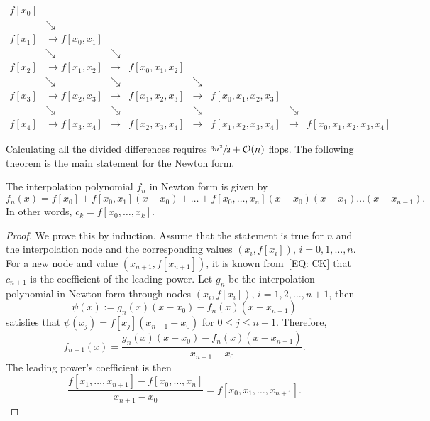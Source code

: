 \begin{tcolorbox}
    \begin{equation}\label{EQ: ALG NEWTON}
    \begin{aligned}
        f[x_0] &               &\\ 
               &\searrow       &\\ 
        f[x_1] &\to f[x_0, x_1]& \\
               &\searrow        &\searrow&\\ 
        f[x_2] & \to f[x_1, x_2]&\to& f[x_0, x_1, x_2]\\
               &\searrow        &\searrow& &\searrow&\\ 
        f[x_3] &\to f[x_2, x_3] &\to& f[x_1, x_2, x_3] &\to & f[x_0, x_1, x_2, x_3]\\
               &\searrow        &\searrow & &\searrow&  &\searrow &\\ 
        f[x_4] & \to f[x_3, x_4]&\to& f[x_2, x_3, x_4] &\to & f[x_1, x_2, x_3, x_4] &\to&  f[x_0, x_1, x_2, x_3, x_4] 
    \end{aligned}
\end{equation}
\end{tcolorbox}
Calculating all the divided differences requires $\sfrac{3n^2}{2} +\mathcal O(n)$ flops. The following theorem is the main statement for the Newton form.
\begin{theorem}
\label{Thm: 2-New-for}
    The interpolation polynomial $f_n$ in Newton form is given by 
    \begin{equation}
        f_n(x) = f[x_0] + f[x_0, x_1](x-x_0) + \dots + f[x_0, \dots, x_n](x - x_0)(x - x_1)\dots (x - x_{n-1}).
    \end{equation}
    In other words, $c_k = f[x_0, \dots, x_k]$.
\end{theorem}
\begin{proof}
    We prove this by induction. Assume that the statement is true for $n$ and the interpolation node and the corresponding values  $(x_i, f[x_i])$, $i=0,1,\dots, n$. For a new node and value $(x_{n+1}, f[x_{n+1}])$, it is known from~\eqref{EQ: CK} that $c_{n+1}$ is the coefficient of the leading power. Let $g_n$ be the interpolation polynomial in Newton form through nodes $(x_i, f[x_i])$, $i=1,2,\dots, n+1$, then 
    $$\psi(x)  := g_n(x)(x - x_0) - f_n(x)(x - x_{n+1})$$
    satisfies that $\psi(x_j) = f[x_j](x_{n+1} - x_0)$ for $0\le j\le {n+1}$. Therefore,
    \begin{equation}
        f_{n+1}(x) = \frac{g_n(x)(x - x_0) - f_n(x)(x - x_{n+1})}{x_{n+1} - x_0}.
    \end{equation}
    The leading power's coefficient is then 
    \begin{equation}
        \frac{f[x_1, \dots, x_{n+1}] - f[x_0, \dots, x_n]}{x_{n+1} - x_0} = f[x_0, x_1,\dots, x_{n+1}].
    \end{equation}
\end{proof}
